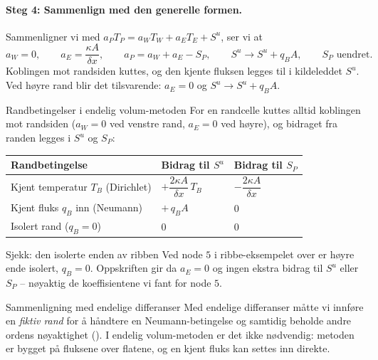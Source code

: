 \paragraph{Steg 4: Sammenlign med den generelle formen.} Sammenligner vi med $a_P T_P = a_W T_W + a_E T_E + S^u$, ser vi at
\[
a_W = 0, \qquad a_E = \frac{\kappa A}{\delta x}, \qquad a_P = a_W + a_E - S_P, \qquad S^u \to S^u + q_B A, \qquad S_P \text{ uendret}.
\]
Koblingen mot randsiden kuttes, og den kjente fluksen legges til i kildeleddet $S^u$. Ved høyre rand blir det tilsvarende: $a_E = 0$ og $S^u \to S^u + q_B A$.

\begin{oppsum}{Randbetingelser i endelig volum-metoden}
For en randcelle kuttes alltid koblingen mot randsiden ($a_W=0$ ved venstre rand, $a_E=0$ ved høyre), og bidraget fra randen legges i $S^u$ og $S_P$:
\begin{center}
\begin{tabular}{lll}
\hline
Randbetingelse & Bidrag til $S^u$ & Bidrag til $S_P$ \\
\hline
Kjent temperatur $T_B$ (Dirichlet) & $+\dfrac{2\kappa A}{\delta x}\,T_B$ & $-\dfrac{2\kappa A}{\delta x}$ \\[3mm]
Kjent fluks $q_B$ inn (Neumann) & $+\,q_B A$ & $0$ \\[2mm]
Isolert rand ($q_B = 0$) & $0$ & $0$ \\
\hline
\end{tabular}
\end{center}
\end{oppsum}

\begin{rem}{Sjekk: den isolerte enden av ribben}
Ved node $5$ i ribbe-eksempelet over er høyre ende isolert, $q_B = 0$. Oppskriften gir da $a_E = 0$ og ingen ekstra bidrag til $S^u$ eller $S_P$ -- nøyaktig de koeffisientene vi fant for node $5$.
\end{rem}

\begin{rem}{Sammenligning med endelige differanser}
Med endelige differanser måtte vi innføre en \emph{fiktiv rand} for å håndtere en Neumann-betingelse og samtidig beholde andre ordens nøyaktighet (). I endelig volum-metoden er det ikke nødvendig: metoden er bygget på fluksene over flatene, og en kjent fluks kan settes inn direkte.
\end{rem}


